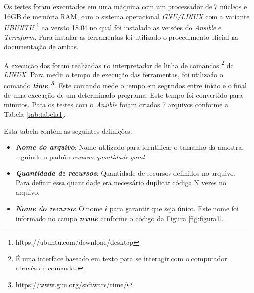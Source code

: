 Os testes foram executados em uma máquina com um processador de 7 núcleos e 16GB de memória RAM, com o sistema operacional \textit{GNU/LINUX} com a variante \textit{UBUNTU} \footnote{https://ubuntu.com/download/desktop} na versão 18.04 no qual foi instalado as versões do \textit{Ansible} e \textit{Terraform}. Para instalar as ferramentas foi utilizado o procedimento oficial na documentação de ambas.

A execução dos foram realizadas no interpretador de linha de comandos \footnote{É uma interface baseado em texto para se interagir com o computador através de comandos} do \textit{LINUX}. Para medir o tempo de execução das ferramentas, foi utilizado o comando \textbf\textit{\textbf{time} \footnote{https://www.gnu.org/software/time/}}. Este comando mede o tempo em segundos entre início e o final de uma execução de um determinado programa. Este tempo foi convertido para minutos. Para os testes com o \textit{Ansible} foram criados 7 arquivos conforme a Tabela \ref{tab:tabela1}.

Esta tabela contém as seguintes definições:
\begin{itemize}
    \item \textbf{\textit{Nome do arquivo}}: Nome utilizado para identificar o tamanho da amostra, seguindo o padrão \textit{recurso-quantidade.yaml}
    \item \textbf{\textit{Quantidade de recursos}}: Quantidade de recursos definidos no arquivo. Para definir essa quantidade era necessário duplicar código N vezes no arquivo.
    \item \textbf{\textit{Nome do recurso}}: O nome é para garantir que seja único. Este nome foi informado no campo \textbf{\textit{name}} conforme o código da Figura \ref{fig:figura1}. 
\end{itemize}

